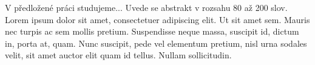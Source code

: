 V předložené práci studujeme...
Uvede se abstrakt v rozsahu 80 až 200 slov. Lorem ipsum dolor sit
amet, consectetuer adipiscing elit. Ut sit amet sem. Mauris nec turpis
ac sem mollis pretium. Suspendisse neque massa, suscipit id, dictum
in, porta at, quam. Nunc suscipit, pede vel elementum pretium, nisl
urna sodales velit, sit amet auctor elit quam id tellus. Nullam sollicitudin.